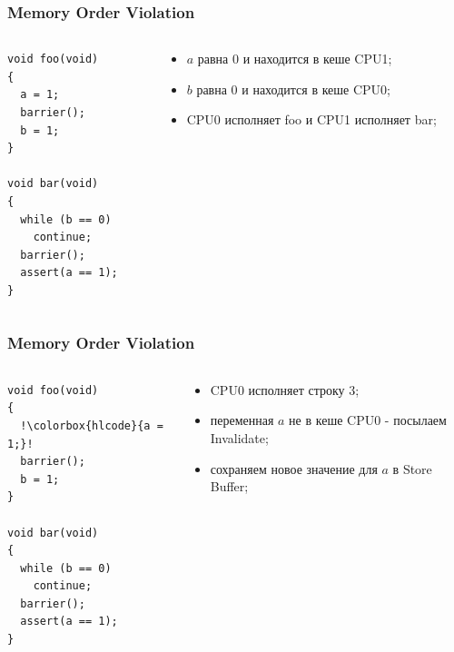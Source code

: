 \begin{frame}[fragile]
\frametitle{Memory Order Violation}

\begin{columns}[T]
  \begin{column}{.4\linewidth}
    \begin{lstlisting}
void foo(void)
{
  a = 1;
  barrier();
  b = 1;
}

void bar(void)
{
  while (b == 0)
    continue;
  barrier();
  assert(a == 1);
}
    \end{lstlisting}
  \end{column}
  \begin{column}{.6\linewidth}
    \begin{itemize}
      \item $a$ равна 0 и находится в кеше CPU1;
      \item $b$ равна 0 и находится в кеше CPU0;
      \item CPU0 исполняет foo и CPU1 исполняет bar;
    \end{itemize}
  \end{column}
\end{columns}
\end{frame}

\begin{frame}[fragile]
\frametitle{Memory Order Violation}

\begin{columns}[T]
  \begin{column}{.4\linewidth}
    \begin{lstlisting}[escapechar=!]
void foo(void)
{
  !\colorbox{hlcode}{a = 1;}!
  barrier();
  b = 1;
}

void bar(void)
{
  while (b == 0)
    continue;
  barrier();
  assert(a == 1);
}
    \end{lstlisting}
  \end{column}
  \begin{column}{.6\linewidth}
    \begin{itemize}
      \item CPU0 исполняет строку 3;
      \item переменная $a$ не в кеше CPU0 - посылаем Invalidate;
      \item сохраняем новое значение для $a$ в Store Buffer;
    \end{itemize}
  \end{column}
\end{columns}
\end{frame}

